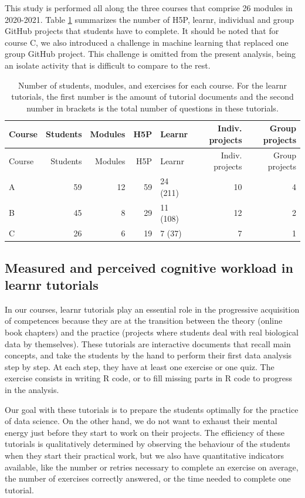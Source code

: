 \documentclass[
]{article}
\begin{document}
This study is performed all along the three courses that comprise 26
modules in 2020-2021. Table \ref {tab:tab_course} summarizes the number
of H5P, learnr, individual and group GitHub projects that students have
to complete. It should be noted that for course C, we also introduced a
challenge in machine learning that replaced one group GitHub project.
This challenge is omitted from the present analysis, being an isolate
activity that is difficult to compare to the rest.

\begin{longtable}[]{@{}lrrrlrr@{}}
\caption{\label{tab:tab_course} Number of students, modules, and
exercises for each course. For the learnr tutorials, the first number is
the amount of tutorial documents and the second number in brackets is
the total number of questions in these tutorials.}\tabularnewline
\toprule
Course & Students & Modules & H5P & Learnr & Indiv. projects & Group
projects \\
\midrule
\endfirsthead
\toprule
Course & Students & Modules & H5P & Learnr & Indiv. projects & Group
projects \\
\midrule
\endhead
A & 59 & 12 & 59 & 24 (211) & 10 & 4 \\
B & 45 & 8 & 29 & 11 (108) & 12 & 2 \\
C & 26 & 6 & 19 & 7 (37) & 7 & 1 \\
\bottomrule
\end{longtable}

\hypertarget{measured-and-perceived-cognitive-workload-in-learnr-tutorials}{%
\subsection{Measured and perceived cognitive workload in learnr
tutorials}\label{measured-and-perceived-cognitive-workload-in-learnr-tutorials}}

In our courses, learnr tutorials play an essential role in the
progressive acquisition of competences because they are at the
transition between the theory (online book chapters) and the practice
(projects where students deal with real biological data by themselves).
These tutorials are interactive documents that recall main concepts, and
take the students by the hand to perform their first data analysis step
by step. At each step, they have at least one exercise or one quiz. The
exercise consists in writing R code, or to fill missing parts in R code
to progress in the analysis.

Our goal with these tutorials is to prepare the students optimally for
the practice of data science. On the other hand, we do not want to
exhaust their mental energy just before they start to work on their
projects. The efficiency of these tutorials is qualitatively determined
by observing the behaviour of the students when they start their
practical work, but we also have quantitative indicators available, like
the number or retries necessary to complete an exercise on average, the
number of exercises correctly answered, or the time needed to complete
one tutorial.
\end{document}
